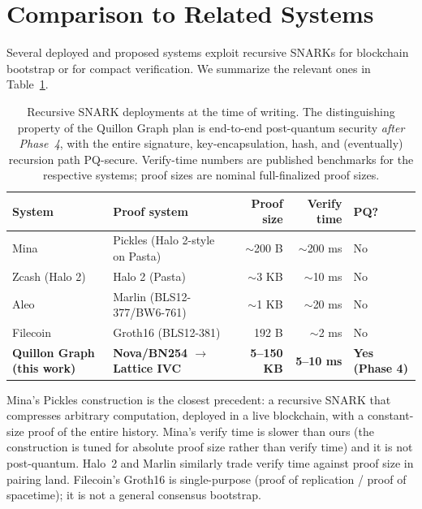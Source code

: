 \documentclass[11pt,a4paper]{article}
\begin{document}
\section{Comparison to Related Systems}
\label{sec:comparison}

Several deployed and proposed systems exploit recursive SNARKs for
blockchain bootstrap or for compact verification. We summarize the
relevant ones in Table~\ref{tab:related}.

\begin{table}[h]
\centering
\small
\begin{tabularx}{\linewidth}{l X r r l}
\toprule
\textbf{System} & \textbf{Proof system} & \textbf{Proof size} & \textbf{Verify time} & \textbf{PQ?} \\
\midrule
Mina             & Pickles (Halo 2-style on Pasta)  & $\sim$200 B    & $\sim$200 ms  & No \\
Zcash (Halo 2)   & Halo 2 (Pasta)                   & $\sim$3 KB     & $\sim$10 ms   & No \\
Aleo             & Marlin (BLS12-377/BW6-761)       & $\sim$1 KB     & $\sim$20 ms   & No \\
Filecoin         & Groth16 (BLS12-381)              & 192 B          & $\sim$2 ms    & No \\
\textbf{Quillon Graph (this work)} & \textbf{Nova/BN254 $\to$ Lattice IVC} & \textbf{5--150 KB} & \textbf{5--10 ms} & \textbf{Yes (Phase 4)} \\
\bottomrule
\end{tabularx}
\caption{Recursive SNARK deployments at the time of writing. The
distinguishing property of the Quillon Graph plan is end-to-end
post-quantum security \emph{after Phase~4}, with the entire signature,
key-encapsulation, hash, and (eventually) recursion path PQ-secure.
Verify-time numbers are published benchmarks for the respective systems;
proof sizes are nominal full-finalized proof sizes.}
\label{tab:related}
\end{table}

Mina's Pickles construction is the closest precedent: a recursive SNARK
that compresses arbitrary computation, deployed in a live blockchain,
with a constant-size proof of the entire history. Mina's verify time
is slower than ours (the construction is tuned for absolute proof size
rather than verify time) and it is not post-quantum. Halo~2 and Marlin
similarly trade verify time against proof size in pairing land.
Filecoin's Groth16 is single-purpose (proof of replication / proof of
spacetime); it is not a general consensus bootstrap.
\end{document}
